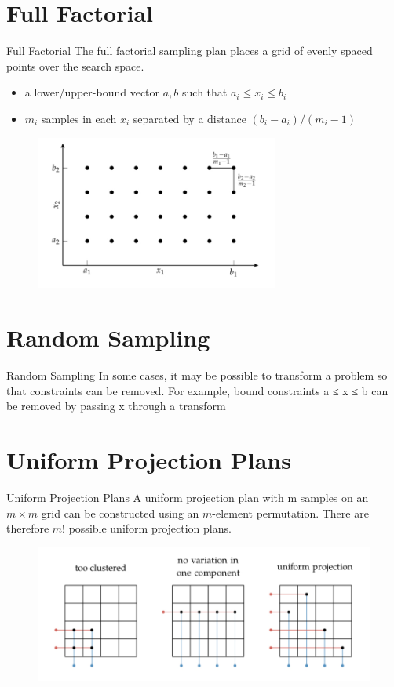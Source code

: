 \documentclass{beamer}
\begin{document}
\section{Full Factorial}
\begin{frame}{Full Factorial}
The full factorial sampling plan places a grid of evenly spaced points over the search space.
\begin{itemize}
    \item a lower/upper-bound vector $a, b$ such that $a_i \leq x_i \leq b_i$
    \item $m_i$ samples in each $x_i$ separated by a distance $(b_i-a_i)/(m_i-1)$
\end{itemize} 
\begin{figure}
\centering
\includegraphics[width=80mm]{Figs/grid_search.jpeg}
\end{figure} 

\end{frame}

\section{Random Sampling}
\begin{frame}{Random Sampling}
In some cases, it may be possible to transform a problem so that constraints can be removed. For example, bound constraints a ≤ x ≤ b can be removed by passing x through a transform

\end{frame}


\section{Uniform Projection Plans}
\begin{frame}{Uniform Projection Plans}
A uniform projection plan with m samples on an $m \times m$ grid can be constructed using an $m$-element permutation. There are therefore $m!$ possible uniform projection plans.
\begin{figure}
\centering
\includegraphics[width=120mm]{Figs/uni-proj.jpeg}
\end{figure} 
\end{frame}
\end{document}
